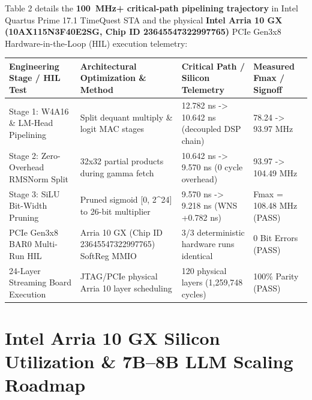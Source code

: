 \documentclass[11pt,a4paper]{article}
\begin{document}
Table 2 details the \textbf{100~MHz+ critical-path pipelining trajectory} in Intel Quartus Prime 17.1 TimeQuest STA and the physical \textbf{Intel Arria 10 GX (10AX115N3F40E2SG, Chip ID 23645547322997765)} PCIe Gen3x8 Hardware-in-the-Loop (HIL) execution telemetry:

{\footnotesize\renewcommand{\arraystretch}{1.14}\begin{longtable}{@{}L{0.23\textwidth}L{0.27\textwidth}L{0.24\textwidth}L{0.16\textwidth}@{}}\toprule

\textbf{Engineering Stage /\allowbreak{} HIL Test} & \textbf{Architectural Optimization \& Method} & \textbf{Critical Path /\allowbreak{} Silicon Telemetry} & \textbf{Measured Fmax /\allowbreak{} Signoff}\\\midrule\endhead

Stage 1: W4A16 \& LM-Head Pipelining & Split dequant multiply \& logit MAC stages & 12.782 ns -> 10.642 ns (\allowbreak{}decoupled DSP chain)\allowbreak{} & 78.24 -> 93.97 MHz\\[2pt]

Stage 2: Zero-Overhead RMSNorm Split & 32x32 partial products during gamma fetch & 10.642 ns -> 9.570 ns (\allowbreak{}0 cycle overhead)\allowbreak{} & 93.97 -> 104.49 MHz\\[2pt]

Stage 3: SiLU Bit-Width Pruning & Pruned sigmoid [\allowbreak{}0,\allowbreak{} 2\textasciicircum{}24]\allowbreak{} to 26-bit multiplier & 9.570 ns -> 9.218 ns (\allowbreak{}WNS +\allowbreak{}0.782 ns)\allowbreak{} & Fmax =\allowbreak{} 108.48 MHz (\allowbreak{}PASS)\allowbreak{}\\[2pt]

PCIe Gen3x8 BAR0 Multi-Run HIL & Arria 10 GX (\allowbreak{}Chip ID 23645547\allowbreak{}32299776\allowbreak{}5)\allowbreak{} SoftReg MMIO & 3/\allowbreak{}3 deterministic hardware runs identical & 0 Bit Errors (\allowbreak{}PASS)\allowbreak{}\\[2pt]

24-Layer Streaming Board Execution & JTAG/\allowbreak{}PCIe physical Arria 10 layer scheduling & 120 physical layers (\allowbreak{}1,\allowbreak{}259,\allowbreak{}748 cycles)\allowbreak{} & 100\% Parity (\allowbreak{}PASS)\allowbreak{}\\[2pt]

\bottomrule\end{longtable}}

\section{Intel Arria 10 GX Silicon Utilization \& 7B--8B LLM Scaling Roadmap}
\end{document}

